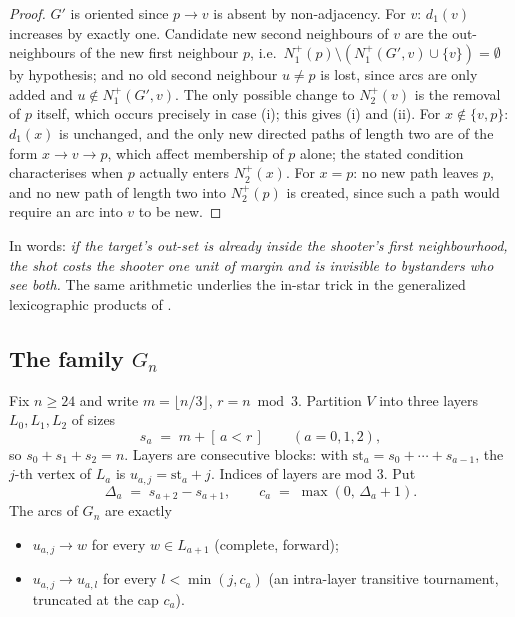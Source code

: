 \documentclass[11pt]{amsart}
\theoremstyle{remark}
\begin{document}
\begin{proof}
$G'$ is oriented since $p \to v$ is absent by non-adjacency. For $v$:
$d_1(v)$ increases by exactly one. Candidate new second neighbours of $v$ are
the out-neighbours of the new first neighbour $p$, i.e.\
$N_1^+(p) \setminus (N_1^+(G',v) \cup \{v\}) = \emptyset$ by hypothesis; and
no old second neighbour $u \ne p$ is lost, since arcs are only added and
$u \notin N_1^+(G', v)$. The only possible change to $N_2^+(v)$ is the removal
of $p$ itself, which occurs precisely in case (i); this gives (i) and (ii).
For $x \notin \{v, p\}$: $d_1(x)$ is unchanged, and the only new directed
paths of length two are of the form $x \to v \to p$, which affect membership
of $p$ alone; the stated condition characterises when $p$ actually enters
$N_2^+(x)$. For $x = p$: no new path leaves $p$, and no new path of length two
into $N_2^+(p)$ is created, since such a path would require an arc into $v$ to
be new.
\end{proof}

In words: \emph{if the target's out-set is already inside the shooter's first
neighbourhood, the shot costs the shooter one unit of margin and is invisible
to bystanders who see both.} The same arithmetic underlies the in-star trick
in the generalized lexicographic products of \cite{GuoKangZwaneveld2026}.

\subsection{The family $G_n$}\label{sec:family}

Fix $n \ge 24$ and write $m = \lfloor n/3 \rfloor$, $r = n \bmod 3$. Partition
$V$ into three layers $L_0, L_1, L_2$ of sizes
\[
s_a \;=\; m + [\,a < r\,] \qquad (a = 0,1,2),
\]
so $s_0 + s_1 + s_2 = n$. Layers are consecutive blocks: with
$\mathrm{st}_a = s_0 + \cdots + s_{a-1}$, the $j$-th vertex of $L_a$ is
$u_{a,j} = \mathrm{st}_a + j$. Indices of layers are mod $3$. Put
\[
\Delta_a \;=\; s_{a+2} - s_{a+1}, \qquad
c_a \;=\; \max(0,\, \Delta_a + 1).
\]
The arcs of $G_n$ are exactly
\begin{itemize}
\item[(R)] $u_{a,j} \to w$ for every $w \in L_{a+1}$ (complete, forward);
\item[(T)] $u_{a,j} \to u_{a,l}$ for every $l < \min(j, c_a)$ (an intra-layer
  transitive tournament, truncated at the cap $c_a$).
\end{itemize}
\end{document}
